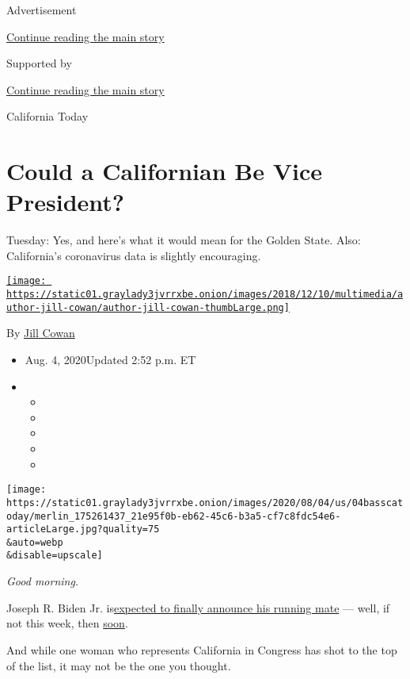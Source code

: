 Advertisement

\protect\hyperlink{after-top}{Continue reading the main story}

Supported by

\protect\hyperlink{after-sponsor}{Continue reading the main story}

California Today

\hypertarget{could-a-californian-be-vice-president}{%
\section{Could a Californian Be Vice
President?}\label{could-a-californian-be-vice-president}}

Tuesday: Yes, and here's what it would mean for the Golden State. Also:
California's coronavirus data is slightly encouraging.

\href{https://www.nytimes3xbfgragh.onion/by/jill-cowan}{\texttt{[image: https://static01.graylady3jvrrxbe.onion/images/2018/12/10/multimedia/author-jill-cowan/author-jill-cowan-thumbLarge.png]}}

By \href{https://www.nytimes3xbfgragh.onion/by/jill-cowan}{Jill Cowan}

\begin{itemize}
\item
  Aug. 4, 2020Updated 2:52 p.m. ET
\item
  \begin{itemize}
  \item
  \item
  \item
  \item
  \item
  \end{itemize}
\end{itemize}

\texttt{[image: https://static01.graylady3jvrrxbe.onion/images/2020/08/04/us/04basscatoday/merlin\_175261437\_21e95f0b-eb62-45c6-b3a5-cf7c8fdc54e6-articleLarge.jpg?quality=75\\\&auto=webp\\\&disable=upscale]}

\emph{Good morning.}

Joseph R. Biden Jr.
is\href{https://www.nytimes3xbfgragh.onion/2020/07/31/us/politics/joseph-biden-vice-president.html}{expected
to finally announce his running mate} --- well, if not this week, then
\href{https://www.nytimes3xbfgragh.onion/article/biden-vice-president-2020.html?}{soon}.

And while one woman who represents California in Congress has shot to
the top of the list, it may not be the one you thought.

